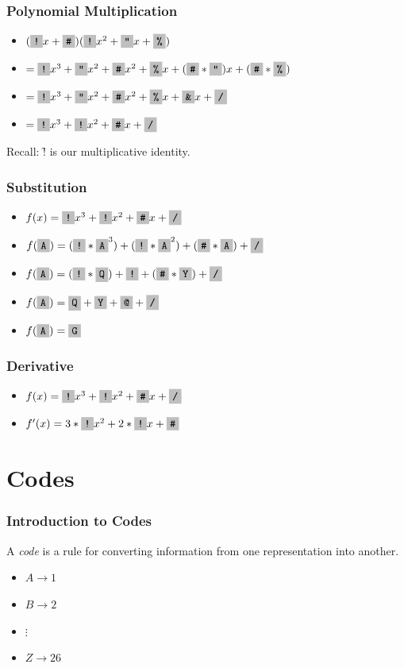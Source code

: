 \documentclass{beamer}
\begin{document}
\begin{frame}
	\frametitle{Polynomial Multiplication}
	\begin{itemize}
		\item[] $(\f{!}x + \f{\#})(\f{!}x^{2} + \f{"}x + \f{\%})$
        \item[] $= \f{!}x^{3} + \f{"}x^{2} + \f{\#}x^{2} + \f{\%}x + (\f{\#} * \f{"})x + (\f{\#} * \f{\%})$
		\item[] $= \f{!}x^{3} + \f{"}x^{2} + \f{\#}x^{2} + \f{\%}x + \f{\&}x + \f{/}$
        \item[] $= \f{!}x^{3} + \f{!}x^{2} + \f{\#}x + \f{/}$
	\end{itemize}
    Recall: \f{!} is our multiplicative identity.
\end{frame}

\begin{frame}
	\frametitle{Substitution}
	\begin{itemize}
		\item[] $f(x) = \f{!}x^{3} + \f{!}x^{2} + \f{\#}x + \f{/}$
		\item[] $f(\f{A}) = (\f{!} * \f{A}^{3}) + (\f{!} * \f{A}^{2}) + (\f{\#} * \f{A}) + \f{/}$
		\item[] $f(\f{A}) = (\f{!} * \f{Q}) + \f{!} + (\f{\#} * \f{Y}) + \f{/}$
		\item[] $f(\f{A}) = \f{Q} + \f{Y} + \f{@} + \f{/}$
		\item[] $f(\f{A}) = \f{G}$
	\end{itemize}
\end{frame}

\begin{frame}
	\frametitle{Derivative}
	\begin{itemize}
		\item[] $f(x) = \f{!}x^{3} + \f{!}x^{2} + \f{\#}x + \f{/}$
		\item[] $f'(x) = 3 * \f{!}x^{2} + 2 * \f{!}x + \f{\#}$
	\end{itemize}
\end{frame}

\section{Codes}

\begin{frame}
	\frametitle{Introduction to Codes}
	A \textit{code} is a rule for converting information from one representation into another.
	
	\begin{itemize}
		\item $A \rightarrow 1$
		\item $B \rightarrow 2$
		\item $ \vdots $
		\item $Z \rightarrow 26$
	\end{itemize}
\end{frame}
\end{document}
